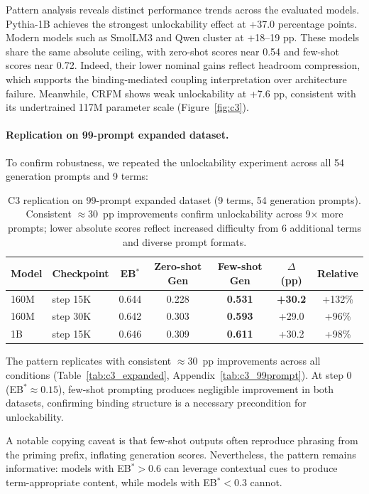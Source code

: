 \documentclass[10pt]{article} %
\begin{document}
Pattern analysis reveals distinct performance trends across the evaluated models.
Pythia-1B achieves the strongest unlockability effect at +37.0 percentage points.
Modern models such as SmolLM3 and Qwen cluster at +18--19 pp. These models share the same absolute ceiling, with zero-shot scores near 0.54 and few-shot scores near 0.72. Indeed, their lower nominal gains reflect headroom compression, which supports the binding-mediated coupling interpretation over architecture failure.
Meanwhile, CRFM shows weak unlockability at +7.6 pp, consistent with its undertrained 117M parameter scale (Figure~\ref{fig:c3}).

\paragraph{Replication on 99-prompt expanded dataset.}
To confirm robustness, we repeated the unlockability experiment across all 54 generation prompts and 9 terms:

\begin{table}[h]
\centering
\small
\begin{tabular}{|l|l|c|c|c|c|c|}
\hline
\textbf{Model} & \textbf{Checkpoint} & \textbf{EB$^*$} & \textbf{Zero-shot Gen} & \textbf{Few-shot Gen} & \textbf{$\Delta$ (pp)} & \textbf{Relative} \\
\hline
160M & step 15K & 0.644 & 0.228 & \textbf{0.531} & \textbf{+30.2} & +132\% \\
160M & step 30K & 0.642 & 0.303 & \textbf{0.593} & +29.0 & +96\% \\
1B & step 15K & 0.646 & 0.309 & \textbf{0.611} & +30.2 & +98\% \\
\hline
\end{tabular}
\caption{C3 replication on 99-prompt expanded dataset (9 terms, 54 generation prompts). Consistent $\approx$30~pp improvements confirm unlockability across 9$\times$ more prompts; lower absolute scores reflect increased difficulty from 6 additional terms and diverse prompt formats.}
\end{table}

The pattern replicates with consistent $\approx$30~pp improvements across all conditions (Table~\ref{tab:c3_expanded}, Appendix~\ref{tab:c3_99prompt}).
At step 0 (EB$^*\approx0.15$), few-shot prompting produces negligible improvement in both datasets, confirming binding structure is a necessary precondition for unlockability.

A notable copying caveat is that few-shot outputs often reproduce phrasing from the priming prefix, inflating generation scores.
Nevertheless, the pattern remains informative: models with EB$^*>0.6$ can leverage contextual cues to produce term-appropriate content, while models with EB$^*<0.3$ cannot.
\end{document}
